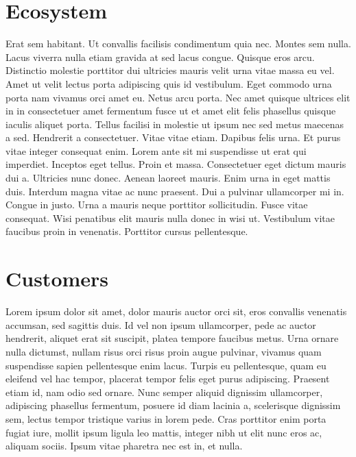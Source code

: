 \documentclass[letterpaper,10pt,openany,oneside,english]{sphinxmanual}
\begin{document}
\section{Ecosystem}
\label{\detokenize{ecosystem:ecosystem}}\label{\detokenize{ecosystem::doc}}
Erat sem habitant. Ut convallis facilisis condimentum quia nec. Montes sem nulla. Lacus viverra nulla etiam gravida at sed lacus congue. Quisque eros arcu. Distinctio molestie porttitor dui ultricies mauris velit urna vitae massa eu vel. Amet ut velit lectus porta adipiscing quis id vestibulum. Eget commodo urna porta nam vivamus orci amet eu. Netus arcu porta. Nec amet quisque ultrices elit in in consectetuer amet fermentum fusce ut et amet elit felis phasellus quisque iaculis aliquet porta. Tellus facilisi in molestie ut ipsum nec sed metus maecenas a sed. Hendrerit a consectetuer. Vitae vitae etiam. Dapibus felis urna. Et purus vitae integer consequat enim. Lorem ante sit mi suspendisse ut erat qui imperdiet. Inceptos eget tellus. Proin et massa. Consectetuer eget dictum mauris dui a. Ultricies nunc donec. Aenean laoreet mauris. Enim urna in eget mattis duis. Interdum magna vitae ac nunc praesent. Dui a pulvinar ullamcorper mi in. Congue in justo. Urna a mauris neque porttitor sollicitudin. Fusce vitae consequat. Wisi penatibus elit mauris nulla donec in wisi ut. Vestibulum vitae faucibus proin in venenatis. Porttitor cursus pellentesque.


\section{Customers}
\label{\detokenize{customers:customers}}\label{\detokenize{customers::doc}}
Lorem ipsum dolor sit amet, dolor mauris auctor orci sit, eros convallis venenatis accumsan, sed sagittis duis. Id vel non ipsum ullamcorper, pede ac auctor hendrerit, aliquet erat sit suscipit, platea tempore faucibus metus. Urna ornare nulla dictumst, nullam risus orci risus proin augue pulvinar, vivamus quam suspendisse sapien pellentesque enim lacus. Turpis eu pellentesque, quam eu eleifend vel hac tempor, placerat tempor felis eget purus adipiscing. Praesent etiam id, nam odio sed ornare. Nunc semper aliquid dignissim ullamcorper, adipiscing phasellus fermentum, posuere id diam lacinia a, scelerisque dignissim sem, lectus tempor tristique varius in lorem pede. Cras porttitor enim porta fugiat iure, mollit ipsum ligula leo mattis, integer nibh ut elit nunc eros ac, aliquam sociis. Ipsum vitae pharetra nec est in, et nulla.
\end{document}
